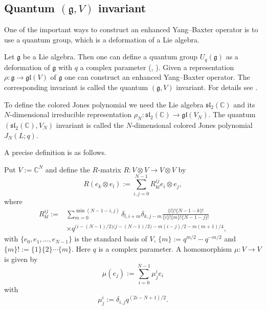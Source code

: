 \documentclass{amsart}
\newcommand{\C}{\mathbb{C}}
\theoremstyle{definition}
\theoremstyle{remark}
\numberwithin{equation}{section}
\begin{document}
\subsection{Quantum $(\mathfrak{g},V)$ invariant}
One of the important ways to construct an enhanced Yang--Baxter operator is to use a quantum group, which is a deformation of a Lie algebra.
\par
Let $\mathfrak{g}$ be a Lie algebra.
Then one can define a quantum group $U_q(\mathfrak{g})$ as a deformation of $\mathfrak{g}$ with $q$ a complex parameter (\cite{Drinfeld:ICM86}, \cite{Jimbo:LETMP1985}).
Given a representation $\rho\colon\mathfrak{g}\to\mathfrak{gl}(V)$ of $\mathfrak{g}$ one can construct an enhanced Yang--Baxter operator.
The corresponding invariant is called the quantum $(\mathfrak{g},V)$ invariant.
For details see \cite{Turaev:INVEM88}.
\par
To define the colored Jones polynomial we need the Lie algebra $\mathfrak{sl}_2(\C)$ and its $N$-dimensional irreducible representation $\rho_N\colon\mathfrak{sl}_2(\C)\to\mathfrak{gl}(V_N)$.
The quantum $(\mathfrak{sl}_2(\C),V_N)$ invariant is called the $N$-dimensional colored Jones polynomial $J_N(L;q)$.
\par
A precise definition is as follows.
\par
Put $V:=\C^N$ and define the $R$-matrix $R\colon V\otimes V\to V\otimes V$ by
\begin{equation*}
  R(e_k\otimes e_l)
  :=
  \sum_{i,j=0}^{N-1}R_{kl}^{ij}e_{i}\otimes e_{j},
\end{equation*}
where
\begin{equation}\label{eq:R}
\begin{split}
  R^{ij}_{kl}
  :=&
  \sum_{m=0}^{\min(N-1-i,j)}
  \delta_{l,i+m}\delta_{k,j-m}
  \frac{\{l\}!\{N-1-k\}!}{\{i\}!\{m\}!\{N-1-j\}!}
  \\
  &
  \times q^{\bigl(i-(N-1)/2\bigr)\bigl(j-(N-1)/2\bigr)-m(i-j)/2-m(m+1)/4},
\end{split}
\end{equation}
with $\{e_0,e_1,\dots,e_{N-1}\}$ is the standard basis of $V$, $\{m\}:=q^{m/2}-q^{-m/2}$ and $\{m\}!:=\{1\}\{2\}\cdots\{m\}$.
Here $q$ is a complex parameter.
A homomorphism $\mu\colon V\to V$ is given by
\begin{equation*}
  \mu(e_j)
  :=
  \sum_{i=0}^{N-1}\mu^i_j e_i
\end{equation*}
with
\begin{equation*}
  \mu^i_j
  :=
  \delta_{i,j}q^{(2i-N+1)/2}.
\end{equation*}
\end{document}
